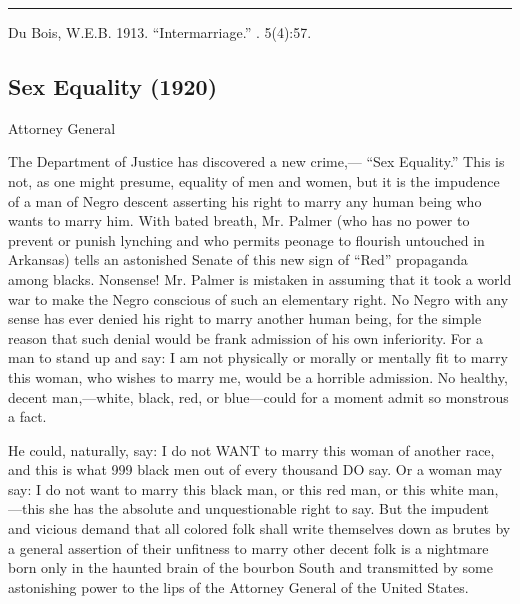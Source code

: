 \documentclass[letterpaper,10pt,english]{jupyterBook}
\begin{document}
\bigskip\hrule\bigskip


\sphinxAtStartPar
{} Du Bois, W.E.B. 1913. “Intermarriage.”  . 5(4):57.


\subsection{Sex Equality (1920)}
\label{\detokenize{Volumes/19/03/sex_equality:sex-equality-1920}}\label{\detokenize{Volumes/19/03/sex_equality::doc}}
\begin{sphinxShadowBox}
\sphinxstylesidebartitle{}

\sphinxAtStartPar
Attorney General 
\end{sphinxShadowBox}

\sphinxAtStartPar
The Department of Justice has discovered a new crime,— “Sex Equality.” This is not, as one might presume, equality of men and women, but it is the impudence of a man of Negro descent asserting his right to marry any human being who wants to marry him. With bated breath, Mr. Palmer (who has no power to prevent or punish lynching and who permits peonage to flourish untouched in Arkansas) tells an astonished Senate of this new sign of “Red” propaganda among blacks. Nonsense! Mr. Palmer is mistaken in assuming that it took a world war to make the Negro conscious of such an elementary right. No Negro with any sense has ever denied his right to marry another human being, for the simple reason that such denial would be frank admission of his own inferiority. For a man to stand up and say: I am not physically or morally or mentally fit to marry this woman, who wishes to marry me, would be a horrible admission. No healthy, decent man,—white, black, red, or blue—could for a moment admit so monstrous a fact.

\sphinxAtStartPar
He could, naturally, say: I do not WANT to marry this woman of another race, and this is what 999 black men out of every thousand DO say. Or a woman may say: I do not want to marry this black man, or this red man, or this white man,—this she has the absolute and unquestionable right to say. But the impudent and vicious demand that all colored folk shall write themselves down as brutes by a general assertion of their unfitness to marry other decent folk is a nightmare born only in the haunted brain of the bourbon South and transmitted by some astonishing power to the lips of the Attorney General of the United States.
\end{document}
